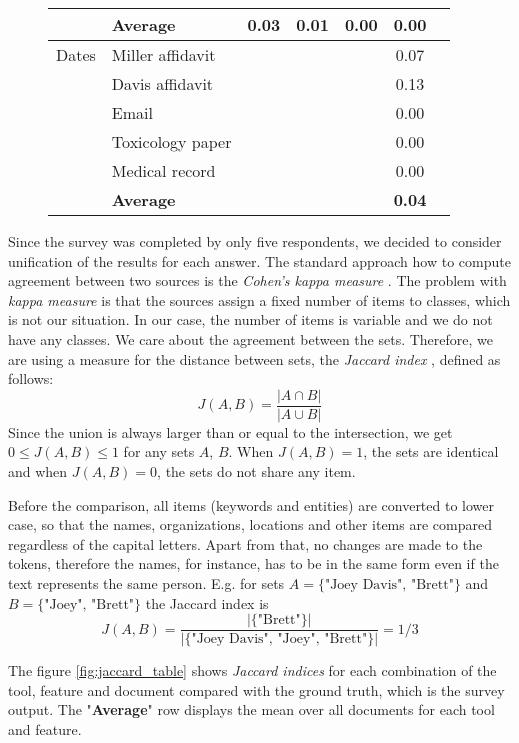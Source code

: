 \documentclass[
  digital, %
  table,   %
  lof,     %
  lot,     %
]{fithesis3}
\begin{document}
\begin{figure}
\begin{tabular}{|l||l||*{5}{c|}}
& \textbf{Average} &\textbf{0.03}&\textbf{0.01}&\textbf{0.00}&\textbf{0.00}\\\hline\hline
Dates & Miller affidavit &&&&0.07\\\hline
& Davis affidavit &&&&0.13\\\hline
& Email &&&&0.00\\\hline
& Toxicology paper &&&&0.00\\\hline
& Medical record &&&&0.00\\\hline\hline
& \textbf{Average} &&&&\textbf{0.04}\\\hline\hline
\end{tabular}
\normalsize
\end{figure}

Since the survey was completed by only five respondents, we decided to consider unification of the results for each answer.
The standard approach how to compute agreement between two sources is the \textit{Cohen's kappa measure} \cite{smeeton1985kappa}.
The problem with \textit{kappa measure} is that the sources assign a fixed number of items to classes, which is not our situation.
In our case, the number of items is variable and we do not have any classes.
We care about the agreement between the sets.
Therefore, we are using a measure for the distance between sets, the \textit{Jaccard index} \cite{levandowsky1971distance}, defined as follows:
$$
J(A, B) = \frac{|A \cap B|}{|A \cup B|}
$$
Since the union is always larger than or equal to the intersection, we get $0 \leq J(A, B) \leq 1$ for any sets $A$, $B$. 
When $J(A,B)=1$, the sets are identical and when $J(A,B)=0$, the sets do not share any item.

Before the comparison, all items (keywords and entities) are converted to lower case, so that the names, organizations, locations and other items are compared regardless of the capital letters.
Apart from that, no changes are made to the tokens, therefore the names, for instance, has to be in the same form even if the text represents the same person. 
E.g. for sets $A=\{\text{"Joey Davis", "Brett"}\}$ and $B=\{\text{"Joey", "Brett"}\}$ the Jaccard index is 
$$
J(A, B) = \frac{|\{\text{"Brett"}\}|}{|\{\text{"Joey Davis", "Joey", "Brett"}\}|} = 1/3
$$

The figure \ref{fig:jaccard_table} shows \textit{Jaccard indices} for each combination of the tool, feature and document compared with the ground truth, which is the survey output.
The "\textbf{Average}" row displays the mean over all documents for each tool and feature.
\end{document}
